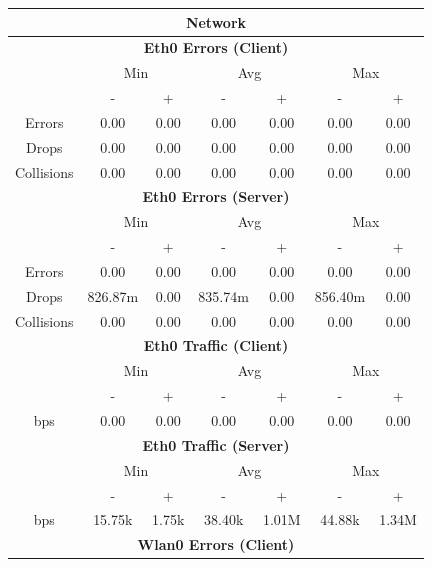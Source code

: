 \documentclass[11pt,a4paper,headinclude=false,footinclude=false]{scrreprt}
\begin{document}
\begin{table}[H]
\centering
    \begin{tabular}{||c|c|c|c|c|c|c||}
    \hline
    \multicolumn{7}{|c|}{\textbf{Network}} \\
    \hline
    \multicolumn{7}{|c|}{\textbf{Eth0 Errors (Client)}} \\
    \hline\hline
      & \multicolumn{2}{|c|}{Min} & \multicolumn{2}{|c|}{Avg} & \multicolumn{2}{|c|}{Max} \\
    \hline
     & - & + & - & + & - & + \\
    \hline
    Errors & 0.00 & 0.00 & 0.00 & 0.00 & 0.00 & 0.00 \\
    \hline
    Drops & 0.00 & 0.00 & 0.00 & 0.00 & 0.00 & 0.00 \\
    \hline
    Collisions & 0.00 & 0.00 & 0.00 & 0.00 & 0.00 & 0.00 \\
    \hline\hline
    \multicolumn{7}{|c|}{\textbf{Eth0 Errors (Server)}} \\
    \hline\hline
      & \multicolumn{2}{|c|}{Min} & \multicolumn{2}{|c|}{Avg} & \multicolumn{2}{|c|}{Max} \\
    \hline
     & - & + & - & + & - & + \\
    \hline
    Errors & 0.00 & 0.00 & 0.00 & 0.00 & 0.00 & 0.00 \\
    \hline
    Drops & 826.87m & 0.00 & 835.74m & 0.00 & 856.40m & 0.00 \\
    \hline
    Collisions & 0.00 & 0.00 & 0.00 & 0.00 & 0.00 & 0.00 \\
    \hline\hline
    \multicolumn{7}{|c|}{\textbf{Eth0 Traffic (Client)}} \\
    \hline\hline
      & \multicolumn{2}{|c|}{Min} & \multicolumn{2}{|c|}{Avg} & \multicolumn{2}{|c|}{Max} \\
    \hline
      & - & + & - & + & - & + \\
    \hline
    bps & 0.00 & 0.00 & 0.00 & 0.00 & 0.00 & 0.00 \\
    \hline\hline
    \multicolumn{7}{|c|}{\textbf{Eth0 Traffic (Server)}} \\
    \hline\hline
      & \multicolumn{2}{|c|}{Min} & \multicolumn{2}{|c|}{Avg} & \multicolumn{2}{|c|}{Max} \\
    \hline
      & - & + & - & + & - & + \\
    \hline
    bps & 15.75k & 1.75k & 38.40k & 1.01M & 44.88k & 1.34M \\
    \hline\hline
    \multicolumn{7}{|c|}{\textbf{Wlan0 Errors (Client)}} \\

\end{tabular}
\end{table}
\end{document}
